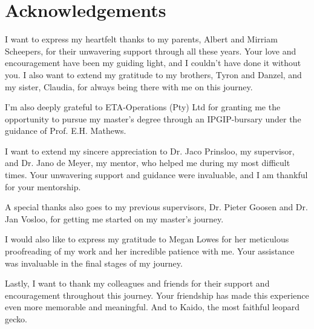 
\cleardoublepage
{}
\chapter*{Acknowledgements}

I want to express my heartfelt thanks to my parents, Albert and Mirriam Scheepers, for their unwavering support through all these years. Your love and encouragement have been my guiding light, and I couldn't have done it without you. I also want to extend my gratitude to my brothers, Tyron and Danzel, and my sister, Claudia, for always being there with me on this journey.\par I'm also deeply grateful to ETA-Operations (Pty) Ltd for granting me the opportunity to pursue my master's degree through an IPGIP-bursary under the guidance of Prof. E.H. Mathews.\par I want to extend my sincere appreciation to Dr. Jaco Prinsloo, my supervisor, and Dr. Jano de Meyer, my mentor, who helped me during my most difficult times. Your unwavering support and guidance were invaluable, and I am thankful for your mentorship.\par A special thanks also goes to my previous supervisors, Dr. Pieter Goosen and Dr. Jan Vosloo, for getting me started on my master's journey. \par I would also like to express my gratitude to Megan Lowes for her meticulous proofreading of my work and her incredible patience with me. Your assistance was invaluable in the final stages of my journey. \par Lastly, I want to thank my colleagues and friends for their support and encouragement throughout this journey. Your friendship has made this experience even more memorable and meaningful. And to Kaido, the most faithful leopard gecko.